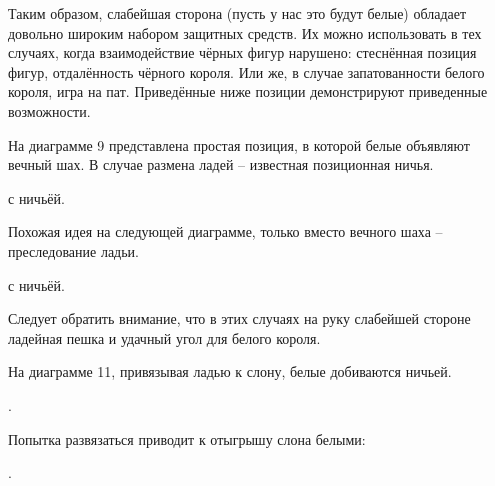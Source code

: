 Таким образом, слабейшая сторона (пусть у нас это будут белые) обладает довольно широким набором защитных средств. Их можно использовать в тех случаях, когда взаимодействие чёрных фигур нарушено: стеснённая позиция фигур, отдалённость чёрного короля. Или же, в случае запатованности белого короля, игра на пат. Приведённые ниже позиции демонстрируют приведенные возможности.
\begin{multicols}{2}[]
\begin{center}
\begin{diagram}%
\end{diagram}%
\end{center}

На диаграмме 9 представлена простая позиция, в которой белые объявляют вечный шах. В случае размена ладей -- известная позиционная ничья. 

 с ничьёй.

\begin{center}
\begin{diagram}%
\end{diagram}%
\end{center}

Похожая идея на следующей диаграмме, только вместо вечного шаха -- преследование ладьи.

 с ничьёй.

Следует обратить внимание, что в этих случаях на руку слабейшей стороне ладейная пешка и удачный угол для белого короля.

\begin{center}
\begin{diagram}%
\end{diagram}%
\end{center}

На диаграмме 11, привязывая ладью к слону, белые добиваются ничьей. 

. 

Попытка развязаться приводит к отыгрышу слона белыми: 

.


\end{multicols}

